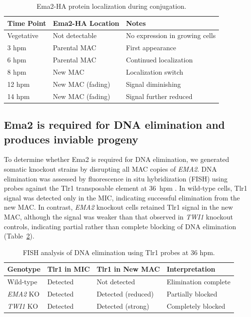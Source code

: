 \documentclass[11pt,a4paper]{article}
\begin{document}
\begin{table}[htbp]
\centering
\caption{Ema2-HA protein localization during conjugation.}
\label{tab:localization}
\begin{tabular}{lll}
\toprule
\textbf{Time Point} & \textbf{Ema2-HA Location} & \textbf{Notes} \\
\midrule
Vegetative & Not detectable & No expression in growing cells \\
3 hpm & Parental MAC & First appearance \\
6 hpm & Parental MAC & Continued localization \\
8 hpm & New MAC & Localization switch \\
12 hpm & New MAC (fading) & Signal diminishing \\
14 hpm & New MAC (fading) & Signal further reduced \\
\bottomrule
\end{tabular}
\end{table}

\subsection{Ema2 is required for DNA elimination and produces inviable progeny}

To determine whether Ema2 is required for DNA elimination, we generated somatic knockout strains by disrupting all MAC copies of \textit{EMA2}. DNA elimination was assessed by fluorescence in situ hybridization (FISH) using probes against the Tlr1 transposable element at 36~hpm \citep{Mochizuki2002}. In wild-type cells, Tlr1 signal was detected only in the MIC, indicating successful elimination from the new MAC. In contrast, \textit{EMA2} knockout cells retained Tlr1 signal in the new MAC, although the signal was weaker than that observed in \textit{TWI1} knockout controls, indicating partial rather than complete blocking of DNA elimination (Table~\ref{tab:fish}).

\begin{table}[htbp]
\centering
\caption{FISH analysis of DNA elimination using Tlr1 probes at 36 hpm.}
\label{tab:fish}
\begin{tabular}{llll}
\toprule
\textbf{Genotype} & \textbf{Tlr1 in MIC} & \textbf{Tlr1 in New MAC} & \textbf{Interpretation} \\
\midrule
Wild-type & Detected & Not detected & Elimination complete \\
\textit{EMA2} KO & Detected & Detected (reduced) & Partially blocked \\
\textit{TWI1} KO & Detected & Detected (strong) & Completely blocked \\
\bottomrule
\end{tabular}
\end{table}
\end{document}
